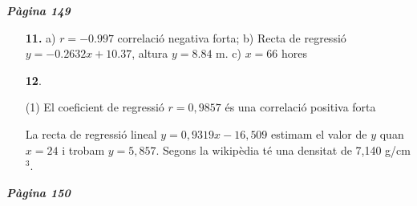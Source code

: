 \documentclass[a4paper, pdf, twoside]{book}
\begin{document}
\begin{multicols}{2}

{\textbf{\em Pàgina 149}} \hrulefill
\begin{enumerate}
\vspace{0.25cm}
\item[\fontfamily{phv}\selectfont\color{blue}\textbf{11. }]  \scalebox{0.6}{\simbolclau } 
a) $r=-0.997$ correlació negativa forta; \quad b) Recta de regressió $y=-0.2632 x+10.37$, altura $y=8.84$ m. \quad c) $x=66$ hores
 \end{enumerate}
\begin{enumerate}
\vspace{0.25cm}



 \item[\fontfamily{phv}\selectfont\color{blue}\textbf{12}. ] 
 \begin{tasks}[column-sep=1em, item-indent=1.3333em](1)
	 \task* El coeficient de regressió $r=0,9857$ és una correlació positiva forta\par {}
	 \task* La recta de regressió lineal $y=0,9319 x-16,509$ estimam el valor de $y$ quan $x=24$ i trobam $y=5,857$. Segons la wikipèdia té una densitat de 7,140 g/cm$^3$.\par {}
\end{tasks}
 \end{enumerate}
\vspace{0.3cm}


{\textbf{\em Pàgina 150}} \hrulefill
\begin{enumerate}
\vspace{0.25cm}




\end{enumerate}
\end{multicols}
\end{document}
